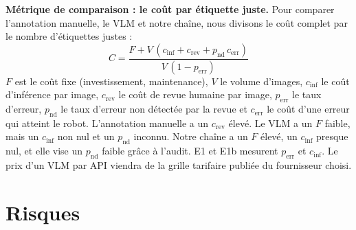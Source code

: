 \documentclass[10pt,a4paper]{article}
\begin{document}
\textbf{Métrique de comparaison : le coût par étiquette juste.} Pour comparer l'annotation manuelle, le VLM et notre chaîne, nous divisons le coût complet par le nombre d'étiquettes justes :
\[
C = \frac{F + V\,(c_{\mathrm{inf}} + c_{\mathrm{rev}} + p_{\mathrm{nd}}\,c_{\mathrm{err}})}{V\,(1-p_{\mathrm{err}})}
\]
$F$ est le coût fixe (investissement, maintenance), $V$ le volume d'images, $c_{\mathrm{inf}}$ le coût d'inférence par image, $c_{\mathrm{rev}}$ le coût de revue humaine par image, $p_{\mathrm{err}}$ le taux d'erreur, $p_{\mathrm{nd}}$ le taux d'erreur non détectée par la revue et $c_{\mathrm{err}}$ le coût d'une erreur qui atteint le robot. L'annotation manuelle a un $c_{\mathrm{rev}}$ élevé. Le VLM a un $F$ faible, mais un $c_{\mathrm{inf}}$ non nul et un $p_{\mathrm{nd}}$ inconnu. Notre chaîne a un $F$ élevé, un $c_{\mathrm{inf}}$ presque nul, et elle vise un $p_{\mathrm{nd}}$ faible grâce à l'audit. E1 et E1b mesurent $p_{\mathrm{err}}$ et $c_{\mathrm{inf}}$. Le prix d'un VLM par API viendra de la grille tarifaire publiée du fournisseur choisi.

\section{Risques}
\end{document}
